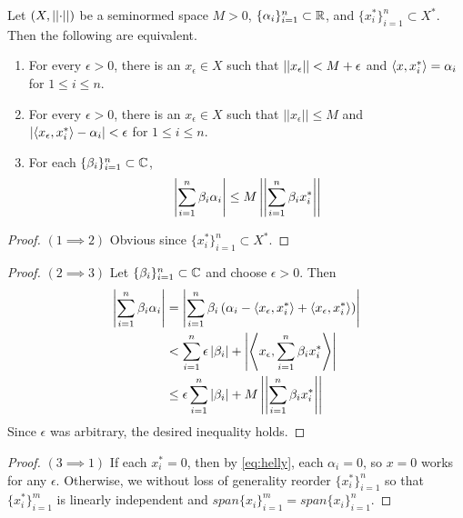 \begin{thm}
    \label{thm:helly}
    Let $(X,\left|\left| \cdot \right|\right|)$ be a seminormed space $M>0$, $\{\alpha_i\}_{i=1}^n \subset \mathbb{R}$, and $\{x_i^*\}_{i=1}^n \subset X^*$. Then the following are equivalent. 
    \begin{enumerate}
        \item For every $\epsilon > 0$, there is an $x_\epsilon \in X$ such that $\left|\left| x_\epsilon \right|\right|< M+\epsilon$ and $\left\langle x,x_i^* \right\rangle=\alpha_i$ for $1 \leq i \leq n$. 
        \item For every $\epsilon > 0$, there is an $x_\epsilon \in X$ such that $||x_\epsilon|| \leq M$ and $\left| \left\langle x_\epsilon,x_i^* \right\rangle-\alpha_i \right|< \epsilon$ for $1 \leq i \leq n$. 
        \item For each $\{\beta_i\}_{i=1}^n \subset \mathbb{C}$, 
        \begin{equation}
            \label{eq:helly}
            \left| \sum_{i=1}^n \beta_i \alpha_i \right| \leq M\left|\left| \sum_{i=1}^n \beta_i x_i^* \right|\right|
        \end{equation}
    \end{enumerate}
    \begin{proof} $(1 \implies 2)$
        Obvious since $\{x_i^*\}_{i=1}^n \subset X^*$. 
    \end{proof}
    \begin{proof} $(2 \implies 3)$
        Let $\{\beta_i\}_{i=1}^n \subset \mathbb{C}$ and choose $\epsilon >0$. 
        Then
        \begin{equation}
            \begin{split}
                \left| \sum_{i=1}^n \beta_i \alpha_i  \right|&= \left|  \sum_{i=1}^n \beta_i \left(  \alpha_i-\left\langle x_\epsilon,x_i^* \right\rangle+\left\langle x_\epsilon,x_i^* \right\rangle\right) \right|\\
                & < \sum_{i=1}^n \epsilon \left| \beta_i \right| + \left|  \left\langle  x_{\epsilon} , \sum_{i=1}^n \beta_ix_i^* \right\rangle \right|\\
                & \leq \epsilon \sum_{i=1}^n \left| \beta_i \right| + M \left|\left| \sum_{i=1}^n \beta_i x_i^* \right|\right|
            \end{split} 
        \end{equation}
        Since $\epsilon$ was arbitrary, the desired inequality holds. 
    \end{proof} 
    \begin{proof} $(3 \implies 1)$
        If each $x_i^*=0$, then by \ref{eq:helly}, each $\alpha_i=0$, so $x=0$ works for any $\epsilon$. 
        Otherwise, we without loss of generality reorder $\{x_i^*\}_{i=1}^n$ so that $\{x_i^*\}_{i=1}^m$ is linearly independent and $span\{x_i\}_{i=1}^m=span\{x_i\}_{i=1}^n$. 

\end{proof}
\end{thm}

